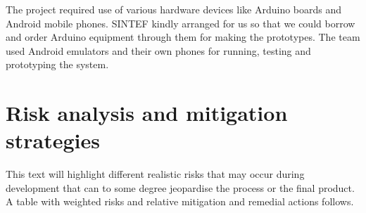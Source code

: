 The project required use of various hardware devices like Arduino boards and Android mobile phones. SINTEF kindly arranged for us so that we could borrow and order Arduino equipment through them for making the prototypes. The team used Android emulators and their own phones for running, testing and prototyping the system.

\newpage
\section{Risk analysis and mitigation strategies}

This text will highlight different realistic risks that may occur during development
that can to some degree jeopardise the process or the final product.
A table with weighted risks and relative mitigation and remedial actions follows.

